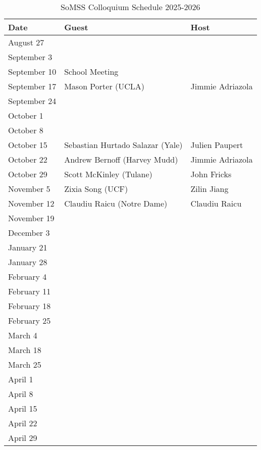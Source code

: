 \documentclass[11pt]{article}
\begin{document}
\begin{table}[htp]
\caption{SoMSS Colloquium Schedule 2025-2026}
\begin{center}
\begin{tabular}{|l|l|l|}
\hline
Date & Guest & Host\\
\hline
August 27 &&\\
September 3 &&\\
September 10 &School Meeting&\\
September 17 & Mason Porter (UCLA) & Jimmie Adriazola \\
September 24 &&\\
October 1 && \\
October 8 &&\\
October 15 &Sebastian Hurtado Salazar (Yale)& Julien Paupert\\
October 22 & Andrew Bernoff (Harvey Mudd)& Jimmie Adriazola\\
October 29 &Scott McKinley (Tulane)& John Fricks\\
November 5 &Zixia Song (UCF)& Zilin Jiang\\
November 12 &Claudiu Raicu (Notre Dame)& Claudiu Raicu \\
November 19 && \\
December 3 && \\
January 21 && \\
January 28 &&\\
February 4 && \\
February 11 && \\
February 18 &&\\
February 25 && \\
March 4 &&\\
March 18 && \\
March 25 && \\
April 1 && \\
April 8 &&\\ 
April 15 && \\
April 22 && \\
April 29 && \\
\hline
\end{tabular}
\end{center}
\end{table}%
\end{document}
